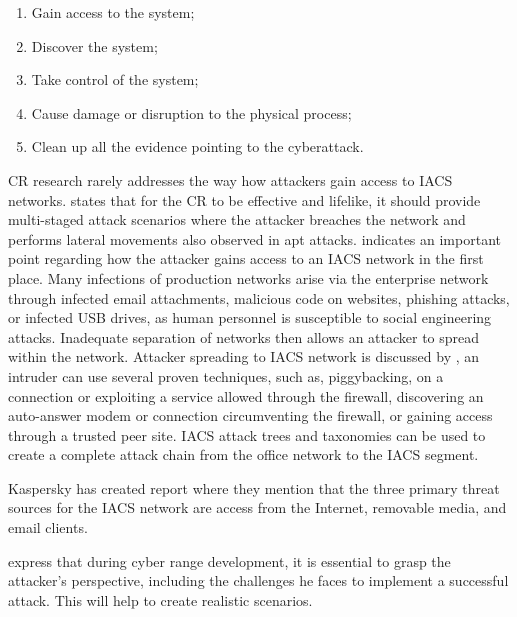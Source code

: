 \begin{enumerate}
	\item Gain access to the system;
	\item Discover the system;
	\item Take control of the system;
	\item Cause damage or disruption to the physical process;
	\item Clean up all the evidence pointing to the cyberattack.
\end{enumerate}

CR research rarely addresses the way how attackers gain access to IACS networks. \citeauthor{48-red-tee-ics-testbed} \parencite{48-red-tee-ics-testbed} states that for the CR to be effective and lifelike, it should provide multi-staged attack scenarios where the attacker breaches the network and performs lateral movements also observed in \gls*{apt} attacks. \citeauthor{22-ICS-testbed-design-and-architect} \parencite{22-ICS-testbed-design-and-architect} indicates an important point regarding how the attacker gains access to an IACS network in the first place. Many infections of production networks arise via the enterprise network through infected email attachments, malicious code on websites, phishing attacks, or infected USB drives, as human personnel is susceptible to social engineering attacks. Inadequate separation of networks then allows an attacker to spread within the network. Attacker spreading to IACS network is discussed by \citeauthor{44-idaho-scada-testlab.pdf} \parencite{44-idaho-scada-testlab.pdf}, an intruder can use several proven techniques, such as, piggybacking, on a connection or exploiting a service allowed through the firewall, discovering an auto-answer modem or connection circumventing the firewall, or gaining access through a trusted peer site. IACS attack trees and taxonomies can be used to create a complete attack chain from the office network to the IACS segment.

Kaspersky has created report  \parencite{67-kaspersky-threat-landscape-for-industrial-automation-systems-statistics-for-h2-2020-en} where they mention that the three primary threat sources for the IACS network are access from the Internet, removable media, and email clients.

\citeauthor{15-testbed-SCADA-atack} \parencite{15-testbed-SCADA-atack} express that during cyber range development, it is essential to grasp the attacker's perspective, including the challenges he faces to implement a successful attack. This will help to create realistic scenarios.

